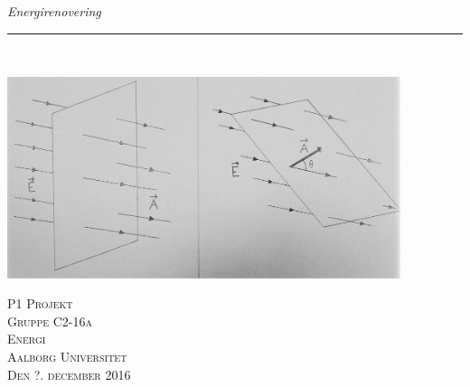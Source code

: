 \thispagestyle{empty}
\begin{flushright}
\vspace{3cm}

\phantom{hul}

\phantom{hul}

\phantom{hul}

\textsl{\Huge Energirenovering} \\ \vspace{1cm}

\rule{13cm}{3mm} \\ \vspace{1.5cm}
\vspace{1cm}

\includegraphics[width=0.864\textwidth]{Vildledning/Schematics/Vinkelflux}

\vspace{2cm} 
\textsc{\Large P1 Projekt \\
Gruppe C2-16a \\
Energi\\
Aalborg Universitet\\
Den ?. december 2016\\}
\end{flushright}